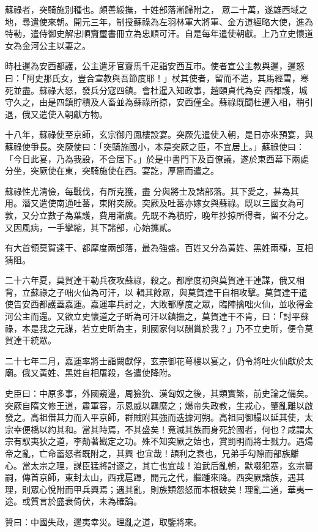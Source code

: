 \begin{pinyinscope}
 蘇祿者，突騎施別種也。頗善綏撫，十姓部落漸歸附之，
 眾二十萬，遂雄西域之地，尋遣使來朝。開元三年，制授蘇祿為左羽林軍大將軍、金方道經略大使，進為特勒，遣侍御史解忠順齎璽書冊立為忠順可汗。自是每年遣使朝獻。上乃立史懷道女為金河公主以妻之。



 時杜暹為安西都護，公主遣牙官齎馬千疋詣安西互市。使者宣公主教與暹，暹怒曰：「阿史那氏女，豈合宣教與吾節度耶！」杖其使者，留而不遣，其馬經雪，寒死並盡。蘇祿大怒，發兵分寇四鎮。會杜暹入知政事，趙頤貞代為安
 西都護，城守久之，由是四鎮貯積及人畜並為蘇祿所掠，安西僅全。蘇祿既聞杜暹入相，稍引退，俄又遣使入朝獻方物。



 十八年，蘇祿使至京師，玄宗御丹鳳樓設宴。突厥先遣使入朝，是日亦來預宴，與蘇祿使爭長。突厥使曰：「突騎施國小，本是突厥之臣，不宜居上。」蘇祿使曰：「今日此宴，乃為我設，不合居下。」於是中書門下及百僚議，遂於東西幕下兩處分坐，突厥使在東，突騎施使在西。宴訖，厚齎而遣之。



 蘇祿性尤清儉，每戰伐，有所克獲，盡
 分與將士及諸部落。其下愛之，甚為其用。潛又遣使南通吐蕃，東附突厥。突厥及吐蕃亦嫁女與蘇祿。既以三國女為可敦，又分立數子為葉護，費用漸廣。先既不為積貯，晚年抄掠所得者，留不分之。又因風病，一手攣縮，其下諸部，心始攜貳。



 有大首領莫賀達干、都摩度兩部落，最為強盛。百姓又分為黃姓、黑姓兩種，互相猜阻。



 二十六年夏，莫賀達干勒兵夜攻蘇祿，殺之。都摩度初與莫賀達干連謀，俄又相背，立蘇祿之子咄火仙為可汗，以
 輯其餘眾，與莫賀達干自相攻擊。莫賀達干遣使告安西都護蓋嘉運。嘉運率兵討之，大敗都摩度之眾，臨陣擒咄火仙，並收得金河公主而還。又欲立史懷道之子昕為可汗以鎮撫之，莫賀達干不肯，曰：「討平蘇祿，本是我之元謀，若立史昕為主，則國家何以酬賞於我？」乃不立史昕，便令莫賀達干統眾。



 二十七年二月，嘉運率將士詣闕獻俘，玄宗御花萼樓以宴之，仍令將吐火仙獻於太廟。俄又黃姓、黑姓自相屠殺，各遣使降附。



 史臣曰：中原多事，外國窺邊，周獫狁、漢匈奴之後，其類實繁，前史論之備矣。突厥自隋文修王道，肅軍容，示恩威以羈縻之；煬帝失政教，生戎心，肇亂離以啟發之。高祖借其力而入平京師，群賊附其強而迭據河朔。高祖同御榻以延其使，太宗幸便橋以約其和。當其時焉，不其盛矣！竟滅其族而身死於國者，何也？咸謂太宗有馭夷狄之道，李勣著戡定之功。殊不知突厥之始也，賞罰明而將士戮力。遇煬帝之亂，亡命蓄怒者既附之，其興
 也宜哉！頡利之衰也，兄弟手勾隙而部族離心。當太宗之理，謀臣猛將討逐之，其亡也宜哉！洎武后亂朝，默啜犯塞，玄宗纂嗣，傳首京師，東封太山，西戎扈蹕，開元之代，繼踵來降。西突厥諸族，遇其理，則眾心悅附而甲兵興焉；遇其亂，則族類怨怒而本根破矣！理亂二道，華夷一途。或質言於盛衰倚伏，未為確論。



 贊曰：中國失政，邊夷幸災。理亂之道，取鑒將來。



\end{pinyinscope}